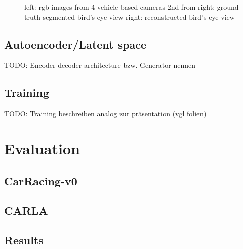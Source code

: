 \documentclass[letterpaper, 10 pt, conference]{ieeeconf}  %
\begin{document}
\begin{figure}[thpb]
   \centering
   \caption{left: rgb images from 4 vehicle-based cameras
            2nd from right: ground truth segmented bird's eye view
            right: reconstructed bird's eye view}
       \label{figurelabel}
       \end{figure}

\subsection{Autoencoder/Latent space}
TODO: Encoder-decoder architecture bzw. Generator nennen
\subsection{Training}
TODO: Training beschreiben analog zur präsentation (vgl folien)


\section{Evaluation}

\subsection{CarRacing-v0}
\subsection{CARLA}

\subsection{Results}
\end{document}
